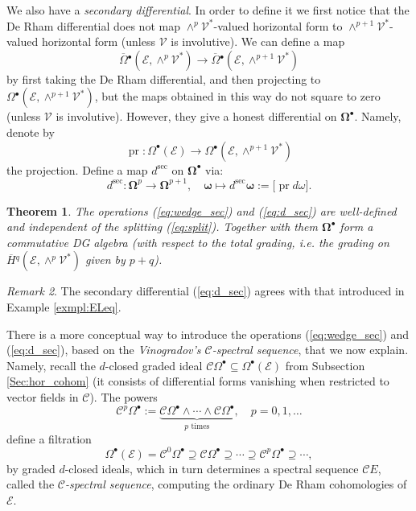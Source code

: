 \documentclass{conm-p-l}
\newtheorem{theorem}{Theorem}[section]
\theoremstyle{definition}
\theoremstyle{remark}
\newtheorem{remark}[theorem]{Remark}
\numberwithin{equation}{section}
\begin{document}
We also have a \emph{secondary differential}.  In order to define it we first notice that the De Rham differential does not map $\wedge^p \mathscr V^\ast$-valued horizontal form to $\wedge^{p+1} \mathscr V^\ast$-valued horizontal form (unless $\mathscr V$ is involutive). We can define a map
\[
\overline \Omega{}^\bullet (\mathscr E, \wedge^p \mathscr V^\ast ) \to \overline \Omega{}^\bullet (\mathscr E, \wedge^{p+1} \mathscr V^\ast )
\]
by first taking the De Rham differential, and then projecting to $\Omega{}^\bullet (\mathscr E, \wedge^{p+1} \mathscr V^\ast )$, but the maps obtained in this way do not square to zero (unless $\mathscr V$ is involutive). However, they give a honest differential on $\boldsymbol{\Omega}^\bullet$. Namely, denote by
\[
\operatorname{pr} : \Omega^\bullet (\mathscr E) \to \Omega{}^\bullet (\mathscr E, \wedge^{p+1} \mathscr V^\ast)
\]
the projection. Define a map $d^{\mathrm{sec}}$ on $\boldsymbol{\Omega}^\bullet$ via:
\begin{equation}\label{eq:d_sec}
d^{\mathrm{sec}} : \boldsymbol \Omega^p \to \boldsymbol \Omega^{p+1}, \quad \boldsymbol \omega \mapsto d^{\mathrm{sec}} \boldsymbol \omega := \big[\operatorname{pr} d \omega \big].
\end{equation}

\begin{theorem}\label{theor:DGA}
The operations (\ref{eq:wedge_sec}) and (\ref{eq:d_sec}) are well-defined and independent of the splitting (\ref{eq:split}). Together with them $\boldsymbol{\Omega}^\bullet$ form a commutative DG algebra (with respect to the \emph{total grading}, i.e.{} the grading on $\overline H{}^q (\mathscr E, \wedge^p \mathscr V^\ast)$ given by $p+q$).
\end{theorem}

\begin{remark}
The secondary differential (\ref{eq:d_sec}) agrees with that introduced in Example \ref{exmpl:ELeq}.
\end{remark}

There is a more conceptual way to introduce the operations (\ref{eq:wedge_sec}) and (\ref{eq:d_sec}), based on the \emph{Vinogradov's $\mathscr C$-spectral sequence}, that we now explain. Namely, recall the $d$-closed graded ideal $\mathscr C \Omega^\bullet \subseteq \Omega^\bullet (\mathscr E)$ from Subsection \ref{Sec:hor_cohom} (it consists of differential forms vanishing when restricted to vector fields in $\mathscr C$).  The powers 
\[
\mathscr C^p \Omega^\bullet := \underset{\text{$p$ times}}{\underbrace{\mathscr C \Omega^\bullet \wedge \cdots \wedge \mathscr C \Omega^\bullet}},\quad p = 0, 1, \ldots
\]
define a filtration
\begin{equation}\label{eq:filtr}
\Omega^\bullet (\mathscr E) = \mathscr C^0 \Omega^\bullet \supseteq \mathscr C \Omega^\bullet \supseteq \cdots \supseteq \mathscr C^p \Omega^\bullet \supseteq \cdots, 
\end{equation}
by graded $d$-closed ideals, which in turn determines a spectral sequence $\mathscr C E$, called the \emph{$\mathscr{C}$-spectral sequence}, computing the ordinary De Rham cohomologies of $\mathscr E$.
\end{document}

